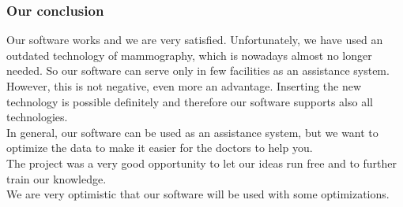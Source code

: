 \subsubsection{Our conclusion}

Our software works and we are very satisfied. Unfortunately, we have used an outdated technology of mammography, which is nowadays almost no longer needed. So our software can serve only in few facilities as an assistance system. However, this is not negative, even more an advantage. Inserting the new technology is possible definitely and therefore our software supports also all technologies.\\
In general, our software can be used as an assistance system, but we want to optimize the data to make it easier for the doctors to help you. \\
The project was a very good opportunity to let our ideas run free and to further train our knowledge.  \\
We are very optimistic that our software will be used with some optimizations.\\
